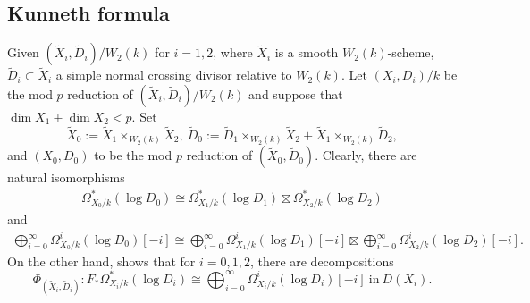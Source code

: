 \documentclass[12pt, a4paper]{article}
\begin{document}
\subsection{Kunneth formula}
Given $(\tilde X_i,\tilde D_i)/W_2(k)$ for $i=1,2$, where $\tilde X_i$ is a smooth $W_2(k)$-scheme, $\tilde D_i\subset\tilde X_i$ a simple normal crossing divisor relative to $W_2(k)$. Let $(X_i,D_i)/k$ be the mod $p$ reduction of $(\tilde X_i,\tilde D_i)/W_2(k)$ and suppose that $\dim X_1+\dim X_2<p$. Set 
$$\tilde X_0:=\tilde X_1\times_{W_2(k)}\tilde X_2,~\tilde D_0:=\tilde D_1\times_{W_2(k)}\tilde X_2+\tilde X_1\times_{W_2(k)}\tilde D_2,$$
and $(X_0,D_0)$ to be the mod $p$ reduction of $(\tilde X_0,\tilde D_0)$. Clearly, there are natural isomorphisms
\begin{eqnarray}\label{kunneth DR}
\Omega^*_{X_0/k}(\log D_0)\cong\Omega^*_{X_1/k}(\log D_1)\boxtimes\Omega^*_{X_2/k}(\log D_2)
\end{eqnarray}
and
\begin{eqnarray}\label{kunneth Higgs}
\bigoplus_{i=0}^{\infty}\Omega^i_{X_0/k}(\log D_0)[-i]\cong\bigoplus_{i=0}^{\infty}\Omega^i_{X_1/k}(\log D_1)[-i]\boxtimes\bigoplus_{i=0}^{\infty}\Omega^i_{X_2/k}(\log D_2)[-i].
\end{eqnarray}
On the other hand, \cite[Th\'eorème 2.1]{DI} shows that for $i=0,1,2$, there are decompositions
$$
\Phi_{(\tilde X_i,\tilde D_i)}:F_*\Omega^*_{X_i/k}(\log D_i)\cong\bigoplus_{i=0}^{\infty}\Omega^i_{X_i/k}(\log D_i)[-i]~\mathrm{in}~D(X_i).
$$
\end{document}

